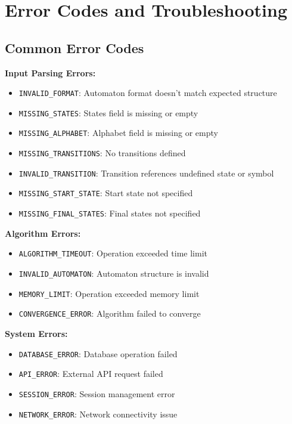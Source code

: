 \documentclass[12pt]{article}
\begin{document}
\section{Error Codes and Troubleshooting}

\subsection{Common Error Codes}
\textbf{Input Parsing Errors:}
\begin{itemize}
    \item \texttt{INVALID\_FORMAT}: Automaton format doesn't match expected structure
    \item \texttt{MISSING\_STATES}: States field is missing or empty
    \item \texttt{MISSING\_ALPHABET}: Alphabet field is missing or empty
    \item \texttt{MISSING\_TRANSITIONS}: No transitions defined
    \item \texttt{INVALID\_TRANSITION}: Transition references undefined state or symbol
    \item \texttt{MISSING\_START\_STATE}: Start state not specified
    \item \texttt{MISSING\_FINAL\_STATES}: Final states not specified
\end{itemize}
\textbf{Algorithm Errors:}
\begin{itemize}
    \item \texttt{ALGORITHM\_TIMEOUT}: Operation exceeded time limit
    \item \texttt{INVALID\_AUTOMATON}: Automaton structure is invalid
    \item \texttt{MEMORY\_LIMIT}: Operation exceeded memory limit
    \item \texttt{CONVERGENCE\_ERROR}: Algorithm failed to converge
\end{itemize}
\textbf{System Errors:}
\begin{itemize}
    \item \texttt{DATABASE\_ERROR}: Database operation failed
    \item \texttt{API\_ERROR}: External API request failed
    \item \texttt{SESSION\_ERROR}: Session management error
    \item \texttt{NETWORK\_ERROR}: Network connectivity issue
\end{itemize}
\end{document}
